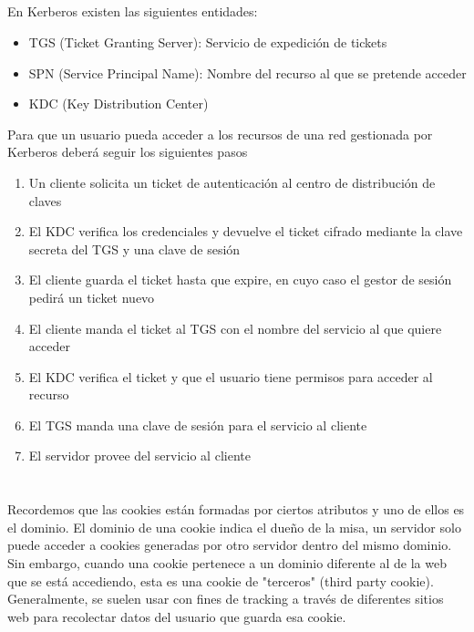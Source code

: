 \documentclass[10pt,a4paper]{article}
\begin{document}
\subsection{}
En Kerberos existen las siguientes entidades:
\begin{itemize}
\item TGS (Ticket Granting Server): Servicio de expedición de tickets
\item SPN (Service Principal Name): Nombre del recurso al que se pretende acceder
\item KDC (Key Distribution Center)
\end{itemize}
Para que un usuario pueda acceder a los recursos de una red gestionada por Kerberos deberá seguir los siguientes pasos
\begin{enumerate}
\item Un cliente solicita un ticket de autenticación al centro de distribución de claves
\item El KDC verifica los credenciales y devuelve el ticket cifrado mediante la clave secreta del TGS y una clave de sesión
\item El cliente guarda el ticket hasta que expire, en cuyo caso el gestor de sesión pedirá un ticket nuevo
\item El cliente manda el ticket al TGS con el nombre del servicio al que quiere acceder
\item El KDC verifica el ticket y que el usuario tiene permisos para acceder al recurso
\item El TGS manda una clave de sesión para el servicio al cliente
\item El servidor provee del servicio al cliente
\end{enumerate}

\section{}
\subsection{}
Recordemos que las cookies están formadas por ciertos atributos y uno de ellos es el dominio. El dominio de una cookie indica el dueño de la misa, un servidor solo puede acceder a cookies generadas por otro servidor dentro del mismo dominio. Sin embargo, cuando una cookie pertenece a un dominio diferente al de la web que se está accediendo, esta es una cookie de "terceros" (third party cookie). Generalmente, se suelen usar con fines de tracking a través de diferentes sitios web para recolectar datos del usuario que guarda esa cookie.\\
\end{document}
